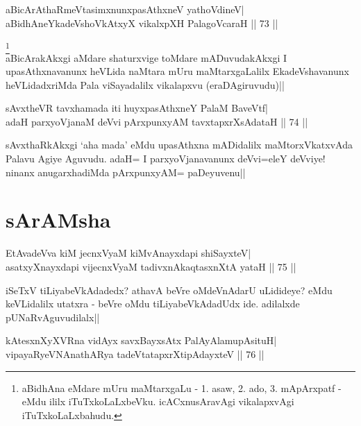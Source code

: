
\begin{shl}
aBicArAthaRmeVtasimxnunxpasAthxneV yathoVdineV| \\
aBidhAneYkadeVshoVkAtxyX vikalxpXH PalagoVcaraH \hfill||  73 || 
\end{shl}

\begin{artha} 
\footnote[1]{aBidhAna eMdare mUru maMtarxgaLu - 1. asaw, 2. ado, 3. 
mApArxpatf - eMdu ililx iTuTxkoLaLxbeVku. icACxnusAravAgi vikalapxvAgi 
iTuTxkoLaLxbahudu.}\\
aBicArakAkxgi aMdare shaturxvige toMdare mADuvudakAkxgi I 
upasAthxnavanunx heVLida naMtara mUru maMtarxgaLalilx EkadeVshavanunx 
heVLidadxriMda Pala viSayadalilx vikalapxvu (eraDAgiruvudu)||
\end{artha}


\begin{shl}
sAvxtheVR tavxhamada iti huyxpasAthxneY PalaM BaveVtf| \\
adaH parxyoVjanaM deVvi pArxpunxyAM tavxtapxrXsAdataH \hfill||  74 || 
\end{shl}

\begin{artha} 
sAvxthaRkAkxgi `aha mada' eMdu upasAthxna mADidalilx maMtorxVkatxvAda 
Palavu Agiye Aguvudu. adaH= I parxyoVjanavanunx deVvi=eleY deVviye! 
ninanx anugarxhadiMda pArxpunxyAM= paDeyuvenu||
\end{artha}

\section*{sArAMsha}

\begin{shl}
EtAvadeVva kiM jecnxVyaM kiMvA\s nayxdapi shiSayxteV| \\
asatxyXnayxdapi vijecnxVyaM tadivxnA\s kaqtasxnXtA yataH \hfill||  75 || 
\end{shl}

\begin{artha} 
iSeTxV tiLiyabeVkAdadedx? athavA beVre oMdeVnAdarU uLidideye? eMdu 
keVLidalilx utatxra - beVre oMdu tiLiyabeVkAdadUdx ide. adilalxde 
pUNaRvAguvudilalx||
\end{artha}

\begin{shl}
kAtesxnXyXVRna vidAyx savxBayxsAtx PalAyAlamupAsituH| \\
vipayaRyeVNAnathARya tadeVtatapxrXtipAdayxteV \hfill||  76 ||
\end{shl}

